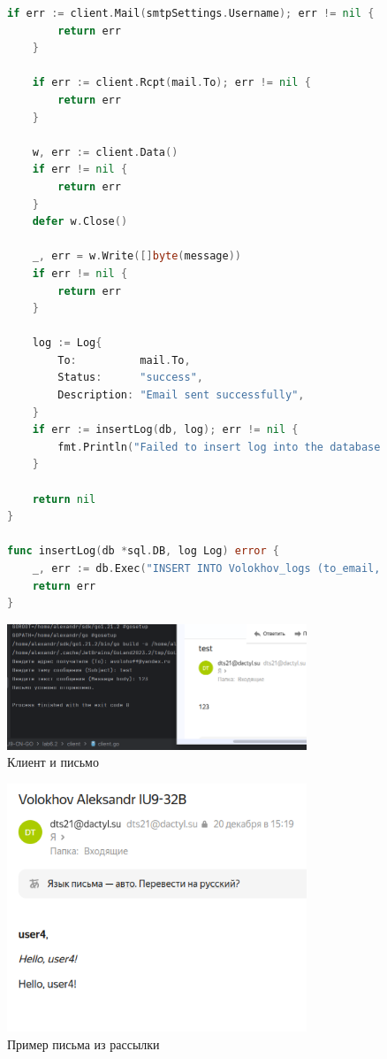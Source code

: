 \documentclass[a4paper, 14pt]{extarticle}
\begin{document}
\newpage
\begin{figure}[!htb]
\begin{lstlisting}[language={Go},caption={app.go - продолжение},label={lst:code3}]
if err := client.Mail(smtpSettings.Username); err != nil {
		return err
	}

	if err := client.Rcpt(mail.To); err != nil {
		return err
	}

	w, err := client.Data()
	if err != nil {
		return err
	}
	defer w.Close()

	_, err = w.Write([]byte(message))
	if err != nil {
		return err
	}

	log := Log{
		To:          mail.To,
		Status:      "success",
		Description: "Email sent successfully",
	}
	if err := insertLog(db, log); err != nil {
		fmt.Println("Failed to insert log into the database:", err)
	}

	return nil
}

func insertLog(db *sql.DB, log Log) error {
	_, err := db.Exec("INSERT INTO Volokhov_logs (to_email, status, description) VALUES (?, ?, ?)", log.To, log.Status, log.Description)
	return err
}
\end{lstlisting}
\end{figure}

\newpage

\begin{figure}[!htb]
	\centering
	\includegraphics[width=0.8\textwidth]{res1.png}
\caption{Клиент и письмо}
\label{fig:img1}
\end{figure}

\begin{figure}[!htb]
	\centering
	\includegraphics[width=0.8\textwidth]{res2.png}
\caption{Пример письма из рассылки}
\label{fig:img2}
\end{figure}
\end{document}
